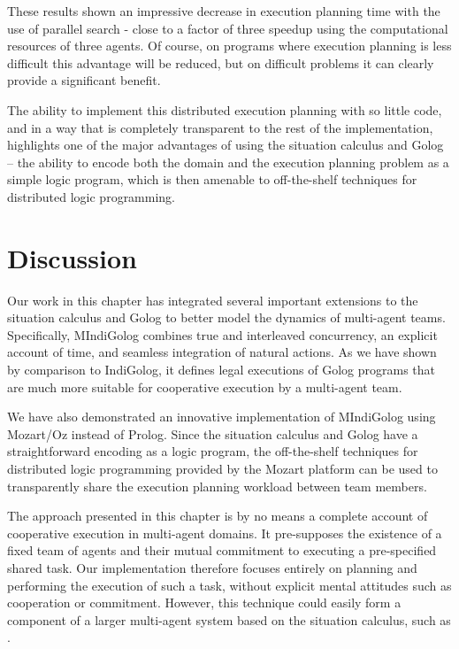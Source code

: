 These results shown an impressive decrease in execution planning time
with the use of parallel search - close to a factor of three speedup
using the computational resources of three agents. Of course, on programs
where execution planning is less difficult this advantage will be
reduced, but on difficult problems it can clearly provide a significant
benefit.

The ability to implement this distributed execution planning with
so little code, and in a way that is completely transparent to the
rest of the implementation, highlights one of the major advantages
of using the situation calculus and Golog -- the ability to encode
both the domain and the execution planning problem as a simple logic
program, which is then amenable to off-the-shelf techniques for distributed
logic programming.


\section{Discussion\label{sec:MIndiGolog:Discussion}}

Our work in this chapter has integrated several important extensions
to the situation calculus and Golog to better model the dynamics of
multi-agent teams. Specifically, MIndiGolog combines true and interleaved
concurrency, an explicit account of time, and seamless integration
of natural actions. As we have shown by comparison to IndiGolog, it
defines legal executions of Golog programs that are much more suitable
for cooperative execution by a multi-agent team.

We have also demonstrated an innovative implementation of MIndiGolog
using Mozart/Oz instead of Prolog. Since the situation calculus and
Golog have a straightforward encoding as a logic program, the off-the-shelf
techniques for distributed logic programming provided by the Mozart
platform can be used to transparently share the execution planning
workload between team members.

The approach presented in this chapter is by no means a complete account
of cooperative execution in multi-agent domains. It pre-supposes the
existence of a fixed team of agents and their mutual commitment to
executing a pre-specified shared task. Our implementation therefore
focuses entirely on planning and performing the execution of such
a task, without explicit mental attitudes such as cooperation or commitment.
However, this technique could easily form a component of a larger
multi-agent system based on the situation calculus, such as \citep{shapiro02casl,lesperance05ecasl}.

